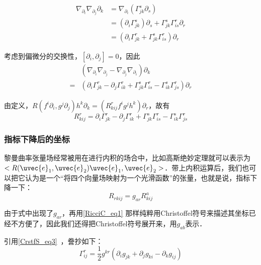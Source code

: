 \begin{equation}
\begin{aligned}
\nabla_{\partial_i}\nabla_{\partial_j}\partial_k&=\nabla_{\partial_i}(\Gamma^s_{jk}\partial_s)\\
&=(\partial_i\Gamma^s_{jk})\partial_s+\Gamma^s_{jk}\Gamma^r_{is}\partial_r\\
&=(\partial_i\Gamma^r_{jk}+\Gamma^s_{jk}\Gamma^r_{is})\partial_r
\end{aligned}
\end{equation}


考虑到偏微分的交换性，$[\partial_i, \partial_j]=0$，因此
\begin{equation}
\begin{aligned}
&(\nabla_{\partial_i}\nabla_{\partial_j}-\nabla_{\partial_j}\nabla_{\partial_i})\partial_k\\
=&(\partial_i\Gamma^r_{jk}-\partial_j\Gamma^{r}_{ik}+\Gamma^s_{jk}\Gamma^r_{is}-\Gamma^s_{ik}\Gamma^r_{js})\partial_r
\end{aligned}
\end{equation}

由定义，$R(f^i\partial_i, g^j\partial_j)h^k\partial_k=(R^r_{kij}f^ig^jh^k)\partial_r$，故有
\begin{equation}\label{RicciC_eq1}
R^r_{kij}=\partial_i\Gamma^r_{jk}-\partial_j\Gamma^{r}_{ik}+\Gamma^s_{jk}\Gamma^r_{is}-\Gamma^s_{ik}\Gamma^r_{js}
\end{equation}

\subsubsection{指标下降后的坐标}

黎曼曲率张量场经常被用在进行内积的场合中，比如高斯绝妙定理就可以表示为$<R(\uvec{e}_1, \uvec{e}_2)\uvec{e}_1, \uvec{e}_2>$．带上内积运算后，我们也可以把它认为是一个“将四个向量场映射为一个光滑函数”的张量，也就是说，指标下降一下：
\begin{equation}
R_{rkij}=g_{ar}R^a_{kij}
\end{equation}

由于式中出现了$g_{ar}$，再用\autoref{RicciC_eq1} 那样纯粹用Christoffel符号来描述其坐标已经不方便了，因此我们还得把Christoffel符号展开来，用$g_{ab}$表示．

引用\autoref{CrstfS_eq3}~，誊抄如下：
\begin{equation}
\Gamma^{r}_{ij}=\frac{1}{2}g^{kr}(\partial_ig_{jk}+\partial_jg_{ki}-\partial_kg_{ij})
\end{equation}

